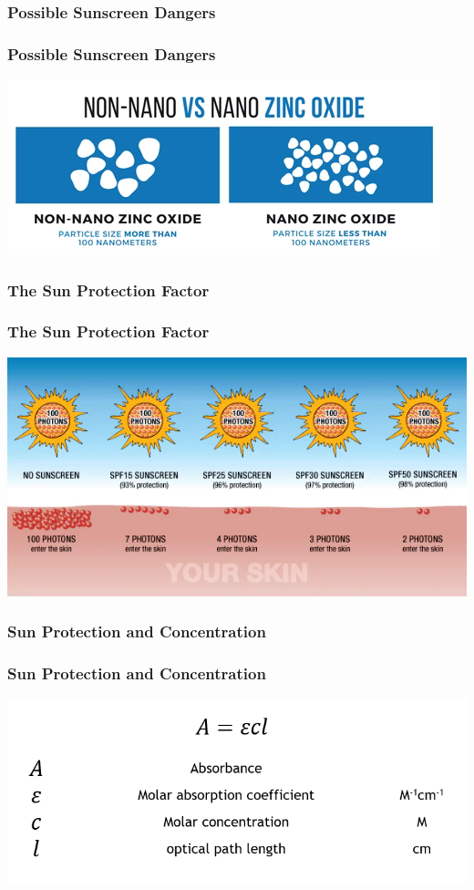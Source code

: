 \documentclass[10pt,aspectratio=169]{beamer} %
\begin{document}
\subsubsection{Possible Sunscreen Dangers}
\begin{frame}\centering
  \frametitle{Possible Sunscreen Dangers}
  \includegraphics[scale = 0.65]{NonNanovsNanoZO.png}
\end{frame}
\subsubsection{The Sun Protection Factor}
\begin{frame}\centering
  \frametitle{The Sun Protection Factor}
  \includegraphics[scale = 0.5]{SPF.png}
\end{frame}
\subsubsection{Sun Protection and Concentration}
\begin{frame}\centering
  \frametitle{Sun Protection and Concentration}
  \includegraphics[scale = 0.65]{beerlambert.png}
\end{frame}
\end{document}
